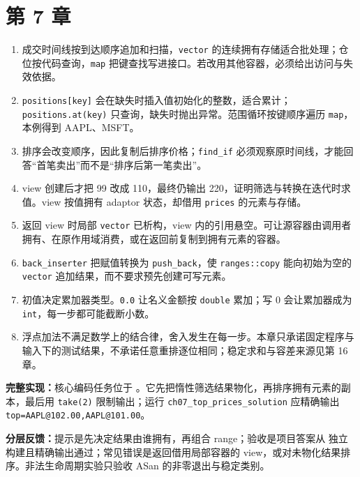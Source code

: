 \section{第 7 章}
\begin{enumerate}
  \item 成交时间线按到达顺序追加和扫描，\texttt{vector} 的连续拥有存储适合批处理；仓位按代码查询，\texttt{map} 把键查找写进接口。若改用其他容器，必须给出访问与失效依据。
  \item \texttt{positions[key]} 会在缺失时插入值初始化的整数，适合累计；\texttt{positions.at(key)} 只查询，缺失时抛出异常。范围循环按键顺序遍历 \texttt{map}，本例得到 AAPL、MSFT。
  \item 排序会改变顺序，因此复制后排序价格；\texttt{find\_if} 必须观察原时间线，才能回答“首笔卖出”而不是“排序后第一笔卖出”。
  \item view 创建后才把 99 改成 110，最终仍输出 220，证明筛选与转换在迭代时求值。view 按值拥有 adaptor 状态，却借用 \texttt{prices} 的元素与存储。
  \item 返回 view 时局部 \texttt{vector} 已析构，view 内的引用悬空。可让源容器由调用者拥有、在原作用域消费，或在返回前复制到拥有元素的容器。
  \item \texttt{back\_inserter} 把赋值转换为 \texttt{push\_back}，使 \texttt{ranges::copy} 能向初始为空的 \texttt{vector} 追加结果，而不要求预先创建可写元素。
  \item 初值决定累加器类型。\texttt{0.0} 让名义金额按 \texttt{double} 累加；写 0 会让累加器成为 \texttt{int}，每一步都可能截断小数。
  \item 浮点加法不满足数学上的结合律，舍入发生在每一步。本章只承诺固定程序与输入下的测试结果，不承诺任意重排逐位相同；稳定求和与容差来源见第 16 章。
\end{enumerate}

\noindent\textbf{完整实现：}核心编码任务位于 。它先把惰性筛选结果物化，再排序拥有元素的副本，最后用 \texttt{take(2)} 限制输出；运行 \texttt{ch07\_top\_prices\_solution} 应精确输出 \texttt{top=AAPL@102.00,AAPL@101.00}。

\textbf{分层反馈：}提示是先决定结果由谁拥有，再组合 range；验收是项目答案从  独立构建且精确输出通过；常见错误是返回借用局部容器的 view，或对未物化结果排序。非法生命周期实验只验收 ASan 的非零退出与稳定类别。

